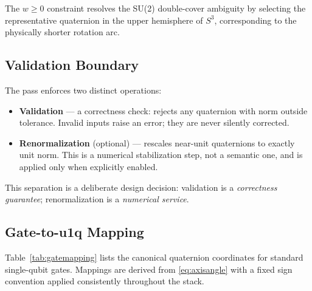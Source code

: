 \documentclass[conference]{IEEEtran}
\begin{document}
The $w \geq 0$ constraint resolves the SU(2) double-cover ambiguity by selecting the
representative quaternion in the upper hemisphere of $S^3$, corresponding to the physically
shorter rotation arc.

\subsection{Validation Boundary}

The pass enforces two distinct operations:

\begin{itemize}
\item \textbf{Validation} --- a correctness check: rejects any quaternion with norm outside
tolerance. Invalid inputs raise an error; they are never silently corrected.
\item \textbf{Renormalization} (optional) --- rescales near-unit quaternions to exactly unit
norm. This is a numerical stabilization step, not a semantic one, and is applied only when
explicitly enabled.
\end{itemize}

This separation is a deliberate design decision: validation is a \textit{correctness
guarantee}; renormalization is a \textit{numerical service}.

\subsection{Gate-to-u1q Mapping}

Table~\ref{tab:gatemapping} lists the canonical quaternion coordinates for standard single-qubit
gates. Mappings are derived from \eqref{eq:axisangle} with a fixed sign convention applied
consistently throughout the stack.
\end{document}
